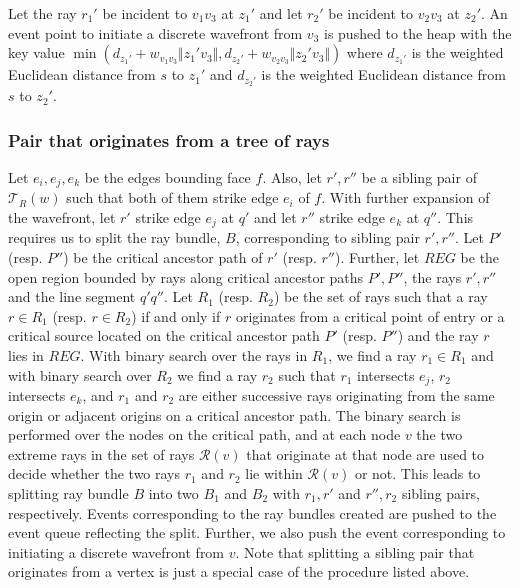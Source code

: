 \documentclass[11pt]{article}
\def\calT{\mathcal{T}}
\def\calR{\mathcal{R}}
\begin{document}
Let the ray $r_1'$ be incident to $v_1v_3$ at $z_1'$ and let $r_2'$ be  incident to $v_2v_3$ at $z_2'$.
An event point to initiate a discrete wavefront from $v_3$ is pushed  to the heap with the key value $\min(d_{z_1'} + w_{v_1v_3} \Vert z_1'v_3 \Vert, d_{z_2'} + w_{v_2v_3} \Vert z_2'v_3 \Vert)$ where $d_{z_1'}$ is the weighted Euclidean distance from $s$ to $z_1'$ and $d_{z_2'}$ is the weighted Euclidean distance from $s$ to $z_2'$.

\subsubsection{Pair that originates from a tree of rays}
\label{subsubsect:splittreeofrays}

Let $e_i, e_j, e_k$ be the edges bounding face $f$.
Also, let $r', r''$ be a sibling pair of $\calT_R(w)$ such that both of them strike edge $e_i$ of $f$.
With further expansion of the wavefront, let $r'$ strike edge $e_j$ at $q'$ and let $r''$ strike edge $e_k$ at $q''$.
This requires us to split the ray bundle, $B$, corresponding to sibling pair $r', r''$.
Let $P'$ (resp. $P''$) be the critical ancestor path of $r'$ (resp. $r''$).
Further, let $REG$ be the open region bounded by rays along critical ancestor paths $P', P''$, the rays $ r', r''$ and the line segment $q'q''$.
Let $R_1$ (resp. $R_2$) be the set of rays such that a ray $r \in R_1$ (resp. $r \in R_2$) if and only if $r$ originates from a critical point of entry or a critical source located on the critical ancestor path $P'$ (resp. $P''$) and the ray $r$ lies in $REG$.
With binary search over the rays in $R_1$, we find a ray $r_1 \in R_1$ and with binary search over $R_2$ we find a ray $r_2$ such that $r_1$ intersects $e_j$, $r_2$ intersects $e_k$, and $r_1$ and $r_2$ are either successive rays originating from the same origin or adjacent origins on a critical ancestor path. The binary search
is performed over the nodes on the critical path, and at each node $v$ the two extreme rays in the set of rays $\calR(v)$ that originate  at that node are used to decide whether the two rays $r_1$ and $r_2$ lie within $\calR(v)$ or not. 
This leads to splitting ray bundle  $B$ into two $B_1$ and $B_2$ 
with $r_1, r'$ and $r'', r_2$ sibling pairs, respectively.
Events corresponding to the ray bundles created are pushed to the event queue reflecting the split.
Further, we also push the event corresponding to initiating a discrete wavefront from $v$.
Note that splitting a sibling pair that originates from a vertex is just a special case of the procedure listed above. 
\end{document}
